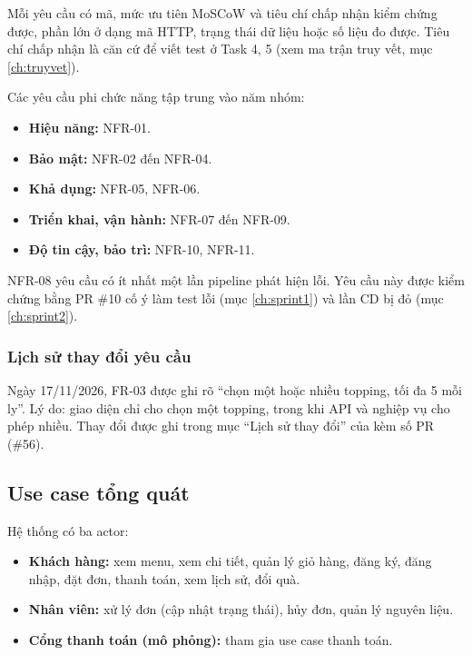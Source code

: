 Mỗi yêu cầu có mã, mức ưu tiên MoSCoW và tiêu chí chấp nhận kiểm chứng được, phần lớn ở dạng mã HTTP, trạng thái dữ liệu hoặc số liệu đo được. Tiêu chí chấp nhận là căn cứ để viết test ở Task 4, 5 (xem ma trận truy vết, mục \ref{ch:truyvet}).




Các yêu cầu phi chức năng tập trung vào năm nhóm:
\begin{itemize}
\item \textbf{Hiệu năng:} NFR-01.
\item \textbf{Bảo mật:} NFR-02 đến NFR-04.
\item \textbf{Khả dụng:} NFR-05, NFR-06.
\item \textbf{Triển khai, vận hành:} NFR-07 đến NFR-09.
\item \textbf{Độ tin cậy, bảo trì:} NFR-10, NFR-11.
\end{itemize}

NFR-08 yêu cầu có ít nhất một lần pipeline phát hiện lỗi. Yêu cầu này được kiểm chứng bằng PR \#10 cố ý làm test lỗi (mục \ref{ch:sprint1}) và lần CD  bị đỏ (mục \ref{ch:sprint2}).



\subsubsection*{Lịch sử thay đổi yêu cầu}
Ngày 17/11/2026, FR-03 được ghi rõ ``chọn một hoặc nhiều topping, tối đa 5 mỗi ly''. Lý do: giao diện  chỉ cho chọn một topping, trong khi API và nghiệp vụ cho phép nhiều. Thay đổi được ghi trong mục ``Lịch sử thay đổi'' của  kèm số PR (\#56).

\subsection{Use case tổng quát}
Hệ thống có ba actor:
\begin{itemize}
\item \textbf{Khách hàng:} xem menu, xem chi tiết, quản lý giỏ hàng, đăng ký, đăng nhập, đặt đơn, thanh toán, xem lịch sử, đổi quà.
\item \textbf{Nhân viên:} xử lý đơn (cập nhật trạng thái), hủy đơn, quản lý nguyên liệu.
\item \textbf{Cổng thanh toán (mô phỏng):} tham gia use case thanh toán.
\end{itemize}

